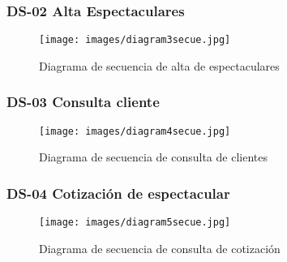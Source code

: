 \subsubsection{DS-02 Alta Espectaculares}
\begin{figure}[htbp!]
    \centering
    \texttt{[image: images/diagram3secue.jpg]}
    \caption{Diagrama de secuencia de alta de espectaculares}
    \label{fig:my_label}
\end{figure}
\clearpage

\subsubsection{DS-03 Consulta cliente}
\begin{figure}[htbp!]
    \centering
    \texttt{[image: images/diagram4secue.jpg]}
    \caption{Diagrama de secuencia de consulta de clientes}
    \label{fig:my_label}
\end{figure}
\clearpage

\subsubsection{DS-04 Cotización de espectacular}
\begin{figure}[htbp!]
    \centering
    \texttt{[image: images/diagram5secue.jpg]}
    \caption{Diagrama de secuencia de consulta de cotización}
    \label{fig:my_label}
\end{figure}
\clearpage

